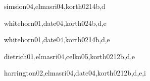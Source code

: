 \begin{syllabus}
\begin{unit}{\IMDataModelingDef}{simsion04,elmasri04,korth02}{14}{b,d}
    \IMDataModelingAllTopics
    \IMDataModelingAllObjectives
\end{unit}

\begin{unit}{\IMIndexingDef}{whitehorn01,date04,korth02}{4}{b,d,e}
    \IMIndexingAllTopics
    \IMIndexingAllObjectives
\end{unit}

\begin{unit}{\IMRelationalDatabasesDef}{whitehorn01,date04,korth02}{14}{b,d,e}
    \IMRelationalDatabasesAllTopics
    \IMRelationalDatabasesAllObjectives
\end{unit}

\begin{unit}{\IMQueryLanguagesDef}{dietrich01,elmasri04,celko05,korth02}{12}{b,d,e}
    \IMQueryLanguagesAllTopics
    \IMQueryLanguagesAllObjectives
\end{unit}

\begin{unit}{\IMRelationalDatabasesDesignDef}{harrington02,elmasri04,date04,korth02}{12}{b,d,e,i}
    \IMRelationalDatabasesDesignAllTopics
    \IMRelationalDatabasesDesignAllObjectives
\end{unit}




\begin{coursebibliography}
\end{coursebibliography}

\end{syllabus}

%
